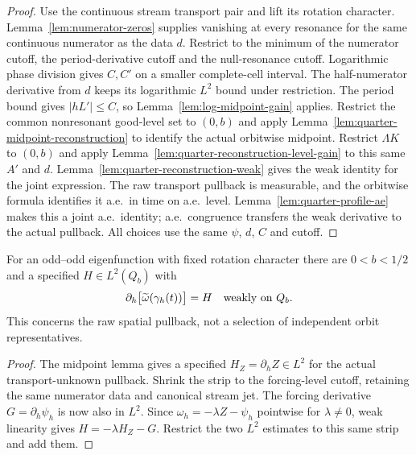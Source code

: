 \begin{proof}
\leanok
Use the continuous stream transport pair and lift its rotation character.
Lemma~\ref{lem:numerator-zeros} supplies vanishing at every resonance
for the same continuous numerator as the data $d$.
Restrict to the minimum of the numerator cutoff, the period-derivative
cutoff and the null-resonance cutoff. Logarithmic phase division gives
$C,C'$ on a smaller complete-cell interval. The half-numerator derivative
from $d$ keeps its logarithmic $L^2$ bound under restriction.
The period bound gives $|hL'|\le C$, so
Lemma~\ref{lem:log-midpoint-gain} applies.
Restrict the common nonresonant good-level set to $(0,b)$ and apply
Lemma~\ref{lem:quarter-midpoint-reconstruction} to identify the actual
orbitwise midpoint. Restrict $\Lambda K$ to $(0,b)$ and apply
Lemma~\ref{lem:quarter-reconstruction-level-gain} to this same $A'$ and
$d$. Lemma~\ref{lem:quarter-reconstruction-weak} gives the weak identity
for the joint expression. The raw transport pullback is measurable, and
the orbitwise formula identifies it a.e.\ in time on a.e.\ level.
Lemma~\ref{lem:quarter-profile-ae} makes this a joint a.e.\ identity;
a.e.\ congruence transfers the weak derivative to the actual pullback.
All choices use the same $\psi$, $d$, $C$ and cutoff.
\end{proof}

\begin{lemma}
\label{lem:dd-quarter-level}
\leanok
For an odd--odd eigenfunction with fixed rotation character there are
$0<b<1/2$ and a specified $H\in L^2(Q_b)$ with
\[
 \partial_h\bigl[\widetilde\omega(\gamma_h(t))\bigr]=H
 \quad\hbox{weakly on }Q_b.
\]
This concerns the raw spatial pullback, not a selection of independent
orbit representatives.
\end{lemma}

\begin{proof}
\leanok
The midpoint lemma gives a specified $H_Z=\partial_h Z\in L^2$
for the actual transport-unknown pullback.
Shrink the strip to the forcing-level cutoff, retaining the same
numerator data and canonical stream jet.
The forcing derivative $G=\partial_h\psi_h$ is now also in $L^2$.
Since $\omega_h=-\lambda Z-\psi_h$ pointwise for $\lambda\ne0$,
weak linearity gives $H=-\lambda H_Z-G$.
Restrict the two $L^2$ estimates to this same strip and add them.
\end{proof}

